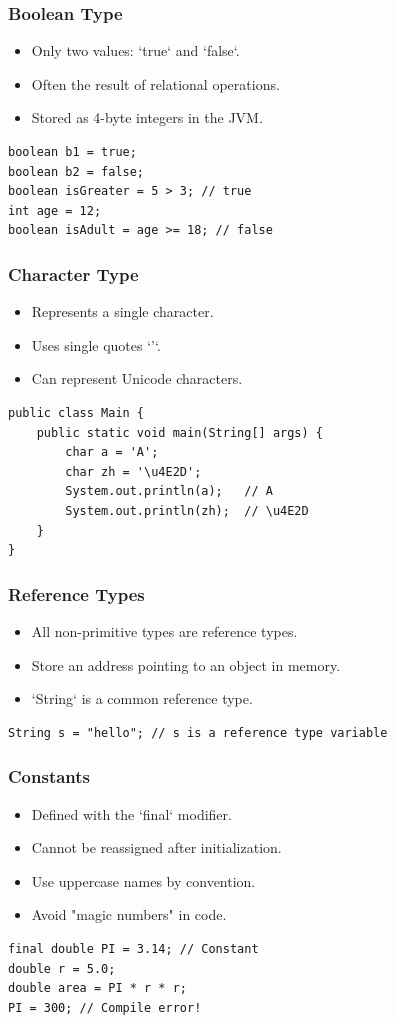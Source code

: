 \documentclass[serif, aspectratio=169]{beamer}
\begin{document}
\begin{frame}[fragile]
\frametitle{Boolean Type}
\begin{itemize}
    \item Only two values: `true` and `false`.
    \item Often the result of relational operations.
    \item Stored as 4-byte integers in the JVM.
\end{itemize}
\begin{lstlisting}
boolean b1 = true;
boolean b2 = false;
boolean isGreater = 5 > 3; // true
int age = 12;
boolean isAdult = age >= 18; // false
\end{lstlisting}
\end{frame}

\begin{frame}[fragile]
\frametitle{Character Type}
\begin{itemize}
    \item Represents a single character.
    \item Uses single quotes `'`.
    \item Can represent Unicode characters.
\end{itemize}
\begin{lstlisting}
public class Main {
    public static void main(String[] args) {
        char a = 'A';
        char zh = '\u4E2D';
        System.out.println(a);   // A
        System.out.println(zh);  // \u4E2D
    }
}
\end{lstlisting}
\end{frame}

\begin{frame}[fragile]
\frametitle{Reference Types}
\begin{itemize}
    \item All non-primitive types are reference types.
    \item Store an address pointing to an object in memory.
    \item `String` is a common reference type.
\end{itemize}
\begin{lstlisting}
String s = "hello"; // s is a reference type variable
\end{lstlisting}
\end{frame}

\begin{frame}[fragile]
\frametitle{Constants}
\begin{itemize}
    \item Defined with the `final` modifier.
    \item Cannot be reassigned after initialization.
    \item Use uppercase names by convention.
    \item Avoid "magic numbers" in code.
\end{itemize}
\begin{lstlisting}
final double PI = 3.14; // Constant
double r = 5.0;
double area = PI * r * r;
PI = 300; // Compile error!
\end{lstlisting}
\end{frame}
\end{document}
